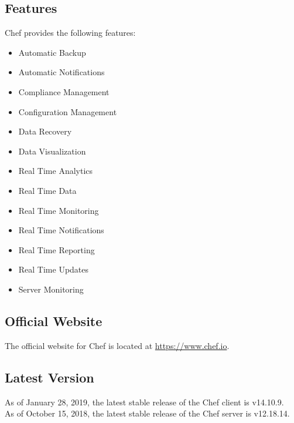 \documentclass[a4paper, 12pt]{article}
\begin{document}
\newpage
\subsection{Features}
Chef provides the following features:
\begin{itemize}
\item
Automatic Backup
\item
Automatic Notifications
\item
Compliance Management
\item
Configuration Management
\item
Data Recovery
\item
Data Visualization
\item
Real Time Analytics
\item
Real Time Data
\item
Real Time Monitoring
\item
Real Time Notifications
\item
Real Time Reporting
\item
Real Time Updates
\item
Server Monitoring

\end{itemize}

\subsection{Official Website}
The official website for Chef is located at \href{https://www.chef.io}{https://www.chef.io}.

\subsection{Latest Version}
As of January 28, 2019, the latest stable release of the Chef client is v14.10.9.\\
As of October 15, 2018, the latest stable release of the Chef server is v12.18.14.
\end{document}
